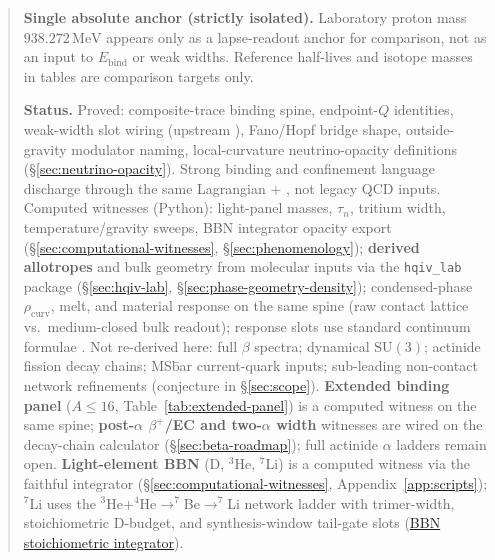 \documentclass[11pt,notitlepage]{amsart}
\begin{document}
\begin{abstract}
\noindent\textbf{Single absolute anchor (strictly isolated).}
Laboratory proton mass $938.272\,\mathrm{MeV}$ appears only as a lapse-readout
anchor for comparison, not as an input to $E_{\mathrm{bind}}$ or weak widths.
Reference half-lives and isotope masses in tables are comparison targets only.

\noindent\textbf{Status.}
Proved: composite-trace binding spine, endpoint-$Q$ identities, weak-width slot
wiring (upstream \cite{hqiv-tuft-sm-lagrangian-paper}), Fano/Hopf bridge shape,
outside-gravity modulator naming, local-curvature neutrino-opacity definitions
(\S\ref{sec:neutrino-opacity}). Strong binding and confinement language discharge
through the same Lagrangian + \cite{hqiv-gluon-curvature-note}, not legacy QCD inputs.
Computed witnesses (Python): light-panel masses, $\tau_n$, tritium width,
temperature/gravity sweeps, BBN integrator opacity export
(\S\ref{sec:computational-witnesses}, \S\ref{sec:phenomenology});
\textbf{derived allotropes} and bulk geometry from molecular inputs via the
\texttt{hqiv\_lab} package (\S\ref{sec:hqiv-lab}, \S\ref{sec:phase-geometry-density});
condensed-phase $\rho_{\mathrm{curv}}$, melt, and material response on the same spine
(raw contact lattice vs.\ medium-closed bulk readout); response slots use standard
continuum formulae \cite{hecht2017optics,ashcroft1976ssp,atkins2018pchem}.
Not re-derived here: full $\beta$ spectra; dynamical $\mathrm{SU}(3)$; actinide
fission decay chains; MS\=bar current-quark inputs; sub-leading non-contact
network refinements (conjecture in \S\ref{sec:scope}). \textbf{Extended binding panel}
($A\le 16$, Table~\ref{tab:extended-panel}) is a computed witness on the same spine;
\textbf{post-$\alpha$ $\beta^+$/EC and two-$\alpha$ width} witnesses are wired on the
decay-chain calculator (\S\ref{sec:beta-roadmap}); full actinide $\alpha$ ladders remain
open. \textbf{Light-element BBN} (D, $^3$He, $^7$Li) is a
computed witness via the faithful integrator (\S\ref{sec:computational-witnesses},
Appendix~\ref{app:scripts}); $^7$Li uses the $^3$He+$^4$He$\to^7$Be$\to^7$Li network ladder
with trimer-width, stoichiometric D-budget, and synthesis-window tail-gate slots
(\hyperref[lean:bbn-stoichiometric]{BBN stoichiometric integrator}).
\end{abstract}
\maketitle
\end{document}
